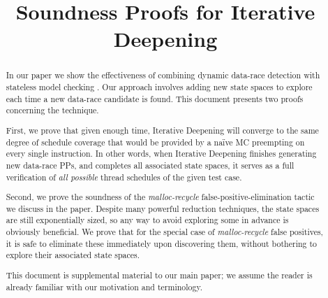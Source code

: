 \documentclass[pldi]{sigplanconf-pldi15}
\begin{document}
%
%

\newcommand\quicksand{\textsc{Quicksand}}
\newcommand\simics{\textsc{Simics}}
\newcommand{\sect}[1]{\S #1}
\newcommand\hilight[2]{\color{#1}#2\color{black}}

\title{Soundness Proofs for Iterative Deepening}

\maketitle
\begin{abstract}
In our paper we show the effectiveness of combining dynamic data-race detection \cite{eraser,hybriddatarace} with stateless model checking \cite{verisoft,dpor}.
Our approach involves adding new state spaces to explore each time a new data-race candidate is found.
This document presents two proofs concerning the technique.

First, we prove that given enough time, Iterative Deepening will converge to the same degree of schedule coverage that would be provided by a na\"{i}ve MC preempting on every single instruction.
In other words, when Iterative Deepening finishes generating new data-race PPs, and completes all associated state spaces,
it serves as a full verification of {\em all possible} thread schedules of the given test case.

Second, we prove the soundness of the {\em malloc-recycle} false-positive-elimination tactic we discuss in the paper.
Despite many powerful reduction techniques, the state spaces are still exponentially sized,
so any way to avoid exploring some in advance is obviously beneficial.
We prove that for the special case of {\em malloc-recycle} false positives, it is safe to eliminate these immediately upon discovering them, without bothering to explore their associated state spaces.


This document is supplemental material to our main paper; we assume the reader is already familiar with our motivation and terminology.
\end{abstract}

\end{document}
